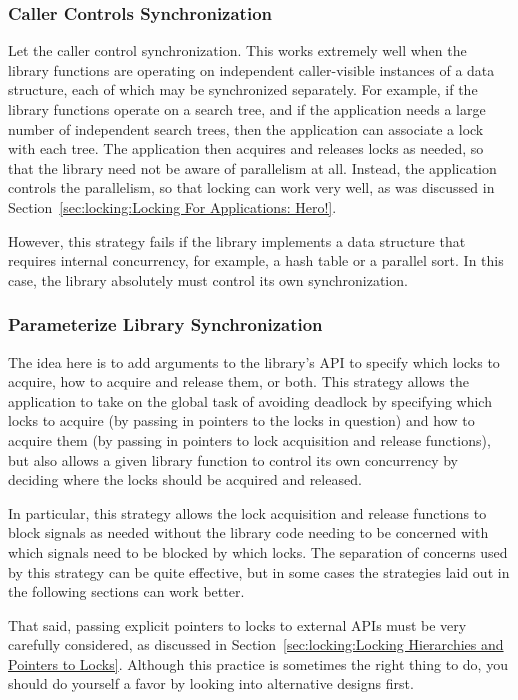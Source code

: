 \subsubsection{Caller Controls Synchronization}
\label{sec:locking:Caller Controls Synchronization}

Let the caller control synchronization.
This works extremely well when the library functions are operating
on independent caller-visible instances of a data structure, each
of which may be synchronized separately.
For example, if the library functions operate on a search tree,
and if the application needs a large number of independent search
trees, then the application can associate a lock with each tree.
The application then acquires and releases locks as needed, so
that the library need not be aware of parallelism at all.
Instead, the application controls the parallelism, so that locking
can work very well, as was discussed in
Section~\ref{sec:locking:Locking For Applications: Hero!}.

However, this strategy fails if the
library implements a data structure that requires internal
concurrency, for example, a hash table or a parallel sort.
In this case, the library absolutely must control its own
synchronization.

\subsubsection{Parameterize Library Synchronization}
\label{sec:locking:Parameterize Library Synchronization}

The idea here is to add arguments to the library's API to specify
which locks to acquire, how to acquire and release them, or both.
This strategy allows the application to take on the global task of
avoiding deadlock by specifying which locks to acquire (by passing in
pointers to the locks in question) and how to
acquire them (by passing in pointers to lock acquisition and release
functions),
but also allows a given library function to control its own concurrency
by deciding where the locks should be acquired and released.

In particular, this strategy allows the lock acquisition and release
functions to block signals as needed without the library code needing to
be concerned with which signals need to be blocked by which locks.
The separation of concerns used by this strategy can be quite effective,
but in some cases the strategies laid out in the following sections
can work better.

That said, passing explicit pointers to locks to external APIs must
be very carefully considered, as discussed in
Section~\ref{sec:locking:Locking Hierarchies and Pointers to Locks}.
Although this practice is sometimes the right thing to do, you should do
yourself a favor by looking into alternative designs first.

